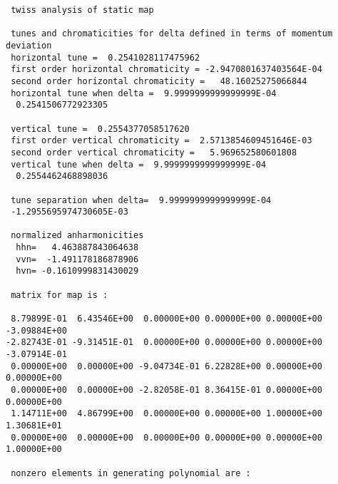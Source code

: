 {\begin{verbatim}
 twiss analysis of static map

 tunes and chromaticities for delta defined in terms of momentum deviation
 horizontal tune =  0.2541028117475962
 first order horizontal chromaticity = -2.9470801637403564E-04
 second order horizontal chromaticity =   48.16025275066844
 horizontal tune when delta =  9.9999999999999999E-04
  0.2541506772923305

 vertical tune =  0.2554377058517620
 first order vertical chromaticity =  2.5713854609451646E-03
 second order vertical chromaticity =   5.969652580601808
 vertical tune when delta =  9.9999999999999999E-04
  0.2554462468898036

 tune separation when delta=  9.9999999999999999E-04
 -1.2955695974730605E-03

 normalized anharmonicities
  hhn=   4.463887843064638
  vvn=  -1.491178186878906
  hvn= -0.1610999831430029

 matrix for map is :

 8.79899E-01  6.43546E+00  0.00000E+00 0.00000E+00 0.00000E+00 -3.09884E+00
-2.82743E-01 -9.31451E-01  0.00000E+00 0.00000E+00 0.00000E+00 -3.07914E-01
 0.00000E+00  0.00000E+00 -9.04734E-01 6.22828E+00 0.00000E+00  0.00000E+00
 0.00000E+00  0.00000E+00 -2.82058E-01 8.36415E-01 0.00000E+00  0.00000E+00
 1.14711E+00  4.86799E+00  0.00000E+00 0.00000E+00 1.00000E+00  1.30681E+01
 0.00000E+00  0.00000E+00  0.00000E+00 0.00000E+00 0.00000E+00  1.00000E+00

 nonzero elements in generating polynomial are :


\end{verbatim}}
